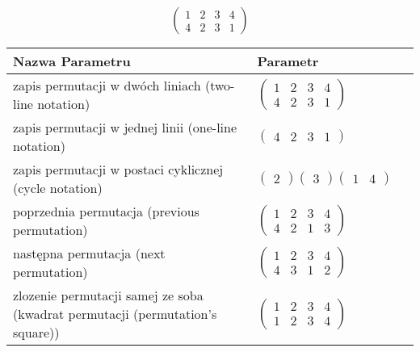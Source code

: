 \documentclass[12pt]{article}
\begin{document}
\subsection{}
\begin{center}
\[
\begin{pmatrix}
	1 & 2 & 3 & 4 \\ 
	4 & 2 & 3 & 1 
\end{pmatrix}
\]

\begin{tabular}{|m{0.6\linewidth}|m{0.4\linewidth}|}
	\hline
	Nazwa Parametru & Parametr \\
	\hline
	zapis permutacji w dwóch liniach (two-line notation) & $\begin{pmatrix} 1 & 2 & 3 & 4 \\ 
4 & 2 & 3 & 1 \end{pmatrix}$ \\ 
	\hline
	zapis permutacji w jednej linii (one-line notation) & $\begin{pmatrix} 4 & 2 & 3 & 1 \end{pmatrix}$ \\ 
	\hline
	zapis permutacji w postaci cyklicznej (cycle notation) & $\begin{pmatrix} 2 \end{pmatrix} \begin{pmatrix} 3 \end{pmatrix} \begin{pmatrix} 1 & 4 \end{pmatrix} $ \\ 
	\hline
	poprzednia permutacja (previous permutation) & $\begin{pmatrix} 1 & 2 & 3 & 4 \\ 
4 & 2 & 1 & 3 \end{pmatrix}$ \\ 
	\hline
	następna permutacja (next permutation) & $\begin{pmatrix} 1 & 2 & 3 & 4 \\ 
4 & 3 & 1 & 2 \end{pmatrix}$ \\ 
	\hline
	zlozenie permutacji samej ze soba (kwadrat permutacji (permutation's square)) & $\begin{pmatrix} 1 & 2 & 3 & 4 \\ 
1 & 2 & 3 & 4 \end{pmatrix}$ \\ 
	\hline
\end{tabular}
\end{center}
\end{document}
